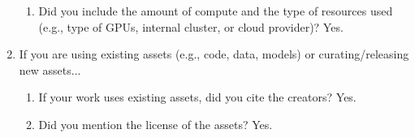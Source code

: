 \begin{enumerate}
\begin{enumerate}

\item  Did you include the amount of compute and the type of resources used (e.g., type of GPUs, internal cluster, or cloud provider)? Yes.




\end{enumerate}

\item If you are using existing assets (e.g., code, data, models) or curating/releasing new assets...

\begin{enumerate}
\item If your work uses existing assets, did you cite the creators?
Yes.




\item Did you mention the license of the assets?
Yes.




\end{enumerate}
\end{enumerate}
